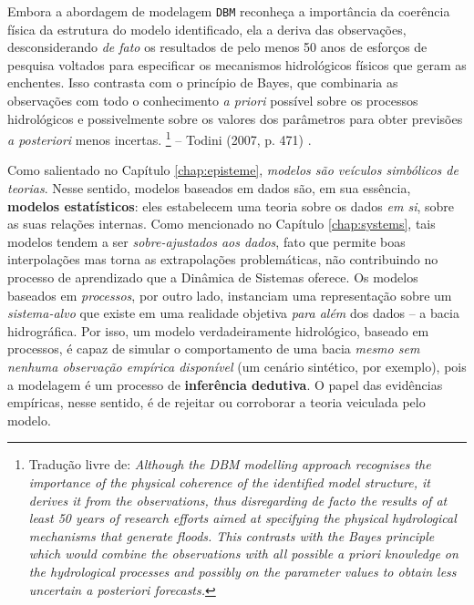 \documentclass[./main.tex]{subfiles}
\begin{document}
\begin{adjustwidth}{100pt}{0pt}
\medskip
\small
Embora a abordagem de modelagem \texttt{DBM} reconheça a importância da coerência física da estrutura do modelo identificado, ela a deriva das observações, desconsiderando \textit{de fato} os resultados de pelo menos 50 anos de esforços de pesquisa voltados para especificar os mecanismos hidrológicos físicos que geram as enchentes. Isso contrasta com o princípio de Bayes, que combinaria as observações com todo o conhecimento \textit{a priori} possível sobre os processos hidrológicos e possivelmente sobre os valores dos parâmetros para obter previsões \textit{a posteriori} menos incertas.
\footnote{Tradução livre de: 
\textit{
Although the DBM modelling approach recognises the importance of the  physical coherence of the identified model structure, it derives it from the observations, thus disregarding de facto the results of at least 50 years of research efforts aimed at specifying the physical hydrological mechanisms that generate floods. This contrasts with the Bayes principle which would combine the observations with all possible a priori knowledge on the hydrological processes and possibly on the parameter values to obtain less uncertain a posteriori forecasts.
}} -- Todini (2007, p. 471) \cite{Todini2007a}.
\medskip
\end{adjustwidth}
\noindent Como salientado no Capítulo \ref{chap:episteme}, \textit{modelos são veículos simbólicos de teorias}. Nesse sentido, modelos baseados em dados são, em sua essência, \textbf{modelos estatísticos}: eles estabelecem uma teoria sobre os dados \textit{em si}, sobre as suas relações internas. Como mencionado no Capítulo \ref{chap:systems}, tais modelos tendem a ser \textit{sobre-ajustados aos dados}, fato que permite boas interpolações mas torna as extrapolações problemáticas, não contribuindo no processo de aprendizado que a Dinâmica de Sistemas oferece. Os modelos baseados em \textit{processos}, por outro lado, instanciam uma representação sobre um \textit{sistema-alvo} que existe em uma realidade objetiva \textit{para além} dos dados -- a bacia hidrográfica. Por isso, um modelo verdadeiramente hidrológico, baseado em processos, é capaz de simular o comportamento de uma bacia \textit{mesmo sem nenhuma observação empírica disponível} (um cenário sintético, por exemplo), pois a modelagem é um processo de \textbf{inferência dedutiva}. O papel das evidências empíricas, nesse sentido, é de rejeitar ou corroborar a teoria veiculada pelo modelo.
\end{document}
